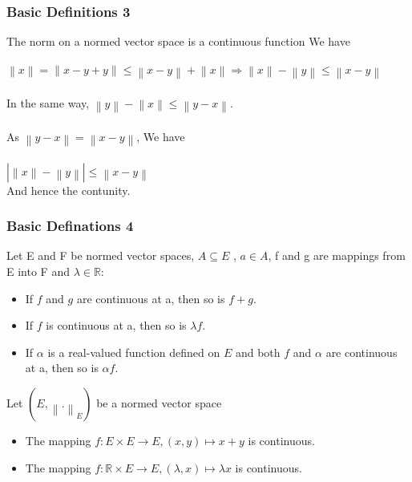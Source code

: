 \documentclass{beamer}
\newcommand{\R}{\mathbb{R}}
\newcommand\norm[1]{\left\lVert#1\right\rVert}
\begin{document}
\begin{frame}
\frametitle{Basic Definitions 3}
\begin{block}{The norm on a normed vector space is a continuous function}
We have \\~\\
$\norm{x} = \norm{x-y+y} \leq \norm{x-y} + \norm{x} \Rightarrow \norm{x} - \norm{y} \leq \norm{x-y}$\\~\\
\pause
In the same way,  $\norm{y} - \norm{x} \leq \norm{y-x}.$ \\~\\ As $\norm{y-x} = \norm{x-y}$, We have
\\~\\ 
$|\norm{x}-\norm{y}| \leq \norm{x-y}$
\\
And hence the contunity.\\
\end{block}

\end{frame}
\begin{frame}
\frametitle{Basic Definations 4}
\begin{block}{Let E and F be normed vector spaces, $A \subseteq E$ , $a \in A$, f and g are mappings from E into F and $\lambda \in \mathbb{R}$:}
\begin{itemize}
\item If $f$ and $g$ are continuous at a, then so is $f + g$.
\item If $f$ is continuous at a, then so is $\lambda f$.
\item If $\alpha$ is a real-valued function defined on $E$ and both $f$ and $\alpha$ are continuous at a, then so is $\alpha f$.
\end{itemize}
\end{block}

\pause

\begin{block}{Let $(E, \norm{.}_{E})$ be a normed vector space}
\begin{itemize}
\item The mapping $ f:E \times E \longrightarrow E , (x,y)\mapsto x + y $ is continuous.
\item The mapping $ f:\R \times E \longrightarrow E , (\lambda,x)\mapsto \lambda x $ is continuous.
\end{itemize}
\end{block}

\end{frame}
\end{document}

